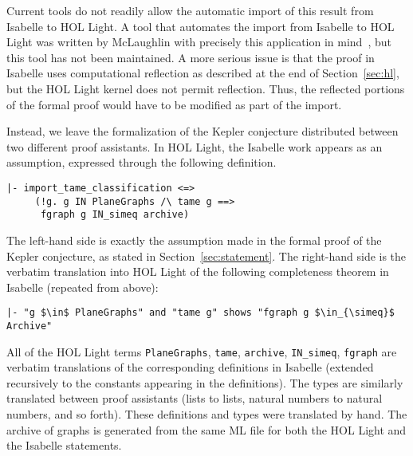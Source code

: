 Current tools do not readily allow the automatic import of this result
from Isabelle to HOL Light.  A tool that automates the import from
Isabelle to HOL Light was written by McLaughlin with precisely this
application in mind~\cite{McLaughlin:2006:IJCAR}, but this tool has
not been maintained.  A more serious issue is that the proof in
Isabelle uses computational reflection as described at the end of
Section~\ref{sec:hl}, but the HOL Light kernel does not permit
reflection.  Thus, the reflected portions of the formal proof would
have to be modified as part of the import.

Instead, we leave the formalization of the Kepler conjecture
distributed between two different proof assistants.  In HOL Light, the
Isabelle work appears as an assumption, expressed through the
following definition.
\begin{obeylines}

\begin{Verbatim}[fontsize=\small]
|- import_tame_classification <=>
     (!g. g IN PlaneGraphs /\ tame g ==> 
      fgraph g IN_simeq archive)
\end{Verbatim}

\end{obeylines}
The left-hand side is exactly the assumption made in the formal proof
of the Kepler conjecture, as stated in Section~\ref{sec:statement}.
The right-hand side is the verbatim translation into HOL Light of the following
completeness theorem in Isabelle (repeated from above):


\begin{lstlisting}[keepspaces=true,stringstyle=\tt,basicstyle=\small,%
frame=none,framesep=8pt,mathescape,morekeywords={and,shows},columns=flexible]
|- "g $\in$ PlaneGraphs" and "tame g" shows "fgraph g $\in_{\simeq}$ Archive"
\end{lstlisting}

All of the HOL Light terms
\verb!PlaneGraphs!, \verb!tame!, \verb!archive!, \verb!IN_simeq!,
\verb!fgraph! are verbatim translations of the corresponding
definitions in Isabelle (extended recursively to the constants
appearing in the definitions).  The types are similarly translated
between proof assistants (lists to lists, natural numbers to natural
numbers, and so forth).  These definitions and types were translated
by hand.  The archive of graphs is generated from the same ML file for
both the HOL Light and the Isabelle statements.  

